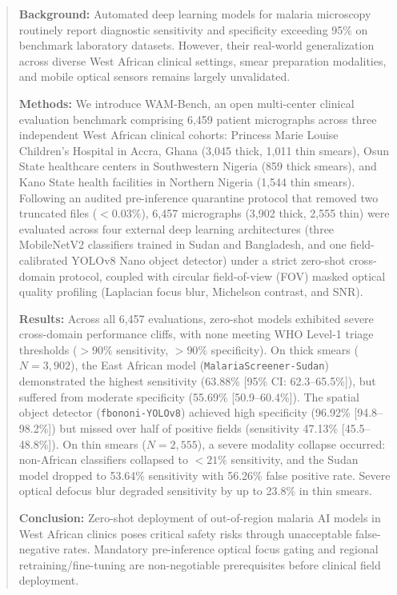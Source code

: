 \documentclass[a4paper,11pt]{article}
\begin{document}
\begin{abstract}
\noindent
\textbf{Background:} Automated deep learning models for malaria microscopy routinely report diagnostic sensitivity and specificity exceeding 95\% on benchmark laboratory datasets. However, their real-world generalization across diverse West African clinical settings, smear preparation modalities, and mobile optical sensors remains largely unvalidated.

\noindent
\textbf{Methods:} We introduce WAM-Bench, an open multi-center clinical evaluation benchmark comprising 6,459 patient micrographs across three independent West African clinical cohorts: Princess Marie Louise Children's Hospital in Accra, Ghana (3,045 thick, 1,011 thin smears), Osun State healthcare centers in Southwestern Nigeria (859 thick smears), and Kano State health facilities in Northern Nigeria (1,544 thin smears). Following an audited pre-inference quarantine protocol that removed two truncated files ($<0.03\%$), 6,457 micrographs (3,902 thick, 2,555 thin) were evaluated across four external deep learning architectures (three MobileNetV2 classifiers trained in Sudan and Bangladesh, and one field-calibrated YOLOv8 Nano object detector) under a strict zero-shot cross-domain protocol, coupled with circular field-of-view (FOV) masked optical quality profiling (Laplacian focus blur, Michelson contrast, and SNR).

\noindent
\textbf{Results:} Across all 6,457 evaluations, zero-shot models exhibited severe cross-domain performance cliffs, with none meeting WHO Level-1 triage thresholds ($>90\%$ sensitivity, $>90\%$ specificity). On thick smears ($N = 3,902$), the East African model (\texttt{MalariaScreener-Sudan}) demonstrated the highest sensitivity (63.88\% [95\% CI: 62.3--65.5\%]), but suffered from moderate specificity (55.69\% [50.9--60.4\%]). The spatial object detector (\texttt{fbononi-YOLOv8}) achieved high specificity (96.92\% [94.8--98.2\%]) but missed over half of positive fields (sensitivity 47.13\% [45.5--48.8\%]). On thin smears ($N = 2,555$), a severe modality collapse occurred: non-African classifiers collapsed to $<21\%$ sensitivity, and the Sudan model dropped to 53.64\% sensitivity with 56.26\% false positive rate. Severe optical defocus blur degraded sensitivity by up to 23.8\% in thin smears.

\noindent
\textbf{Conclusion:} Zero-shot deployment of out-of-region malaria AI models in West African clinics poses critical safety risks through unacceptable false-negative rates. Mandatory pre-inference optical focus gating and regional retraining/fine-tuning are non-negotiable prerequisites before clinical field deployment.
\end{abstract}
\end{document}
